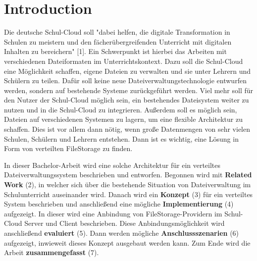 \section{Introduction}
\label{sec:intro}

Die deutsche Schul-Cloud soll "dabei helfen, die digitale Transformation in Schulen zu meistern und den fächerübergreifenden Unterricht mit digitalen Inhalten zu bereichern" [1]. Ein Schwerpunkt ist hierbei das Arbeiten mit verschiedenen Dateiformaten im Unterrichtskontext. Dazu soll die Schul-Cloud eine Möglichkeit schaffen, eigene Dateien zu verwalten und sie unter Lehrern und Schülern zu teilen. Dafür soll keine neue Dateiverwaltungstechnologie entwurfen werden, sondern auf bestehende Systeme zurückgeführt werden. Viel mehr soll für den Nutzer der Schul-Cloud möglich sein, ein bestehendes Dateisystem weiter zu nutzen und in die Schul-Cloud zu integrieren. Außerdem soll es möglich sein, Dateien auf verschiedenen Systemen zu lagern, um eine flexible Architektur zu schaffen. Dies ist vor allem dann nötig, wenn große Datenmengen von sehr vielen Schulen, Schülern und Lehrern entstehen. Dann ist es wichtig, eine Lösung in Form von verteilten FileStorage zu finden.

In dieser Bachelor-Arbeit wird eine solche Architektur für ein verteiltes Dateiverwaltungssystem beschrieben und entworfen. Begonnen wird mit \textbf{Related Work} (2), in welcher sich über die bestehende Situation von Dateiverwaltung im Schulunterricht auseinander wird. Danach wird ein \textbf{Konzept} (3) für ein verteiltes System beschrieben und anschließend eine mögliche \textbf{Implementierung} (4)  aufgezeigt. In dieser wird eine Anbindung von FileStorage-Providern im Schul-Cloud Server und Client beschrieben. Diese Anbindungsmöglichkeit wird anschließend \textbf{evaluiert} (5). Dann werden mögliche \textbf{Anschlussszenarien} (6) aufgezeigt, inwieweit dieses Konzept ausgebaut werden kann. Zum Ende wird die Arbeit \textbf{zusammengefasst} (7).

\clearpage
